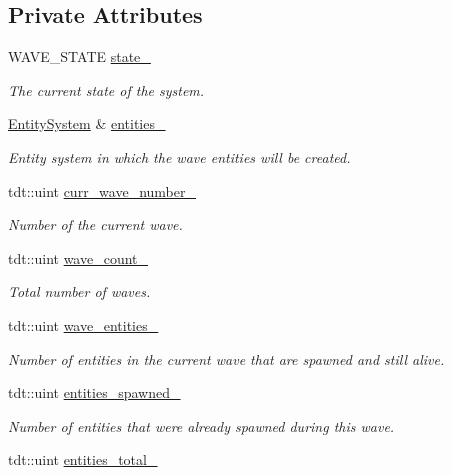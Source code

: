 \subsection*{Private Attributes}
\begin{DoxyCompactItemize}
\item 
W\+A\+V\+E\+\_\+\+S\+T\+A\+TE \hyperlink{class_wave_system_add90dfd41a5917d398623fcea26fb269}{state\+\_\+}
\begin{DoxyCompactList}\small\item\em The current state of the system. \end{DoxyCompactList}\item 
\hyperlink{class_entity_system}{Entity\+System} \& \hyperlink{class_wave_system_a8f590c5b9cf0cd5f7fdc5afee19dd389}{entities\+\_\+}
\begin{DoxyCompactList}\small\item\em Entity system in which the wave entities will be created. \end{DoxyCompactList}\item 
tdt\+::uint \hyperlink{class_wave_system_a10aa7985fe118508460c7c9498c94a69}{curr\+\_\+wave\+\_\+number\+\_\+}
\begin{DoxyCompactList}\small\item\em Number of the current wave. \end{DoxyCompactList}\item 
tdt\+::uint \hyperlink{class_wave_system_af0ea0ae6d2397d9cb0d69cd19eca3177}{wave\+\_\+count\+\_\+}
\begin{DoxyCompactList}\small\item\em Total number of waves. \end{DoxyCompactList}\item 
tdt\+::uint \hyperlink{class_wave_system_a378035c7325464436bce4235678dfe42}{wave\+\_\+entities\+\_\+}
\begin{DoxyCompactList}\small\item\em Number of entities in the current wave that are spawned and still alive. \end{DoxyCompactList}\item 
tdt\+::uint \hyperlink{class_wave_system_ab25df374df710d5fca47d39a39859f66}{entities\+\_\+spawned\+\_\+}
\begin{DoxyCompactList}\small\item\em Number of entities that were already spawned during this wave. \end{DoxyCompactList}\item 
tdt\+::uint \hyperlink{class_wave_system_a222d726e4ea7d49ffe856c5ded840938}{entities\+\_\+total\+\_\+}

\end{DoxyCompactItemize}
